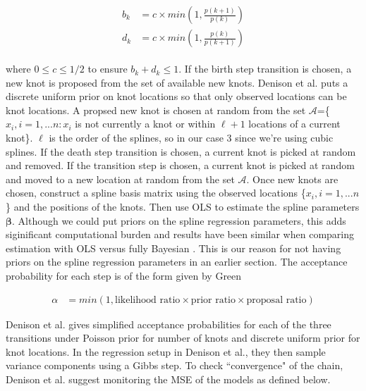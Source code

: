 \documentclass[11pt]{article}\usepackage[]{graphicx}\usepackage[]{color}
\begin{document}
\begin{align}
\begin{split}
\label{knotproposal}
b_k &= c \times min\left(1, \frac{p(k+1)}{p(k)} \right) \\
d_k &= c \times min\left(1, \frac{p(k)}{p(k+1)} \right) 
\end{split}
\end{align}

where $0\leq c \leq 1/2$ to ensure $b_k+d_k \leq 1$. If the birth step transition is chosen, a new knot is proposed from the set of available new knots. Denison et al. puts a discrete uniform prior on knot locations so that only observed locations can be knot locations.  A propsed new knot is chosen at random from the set $\mathcal{A}$=\{$x_i,i=1,...n:x_i$ is not currently a knot or within $\ell+1$ locations of a current knot\}. $\ell$ is the order of the splines, so in our case 3 since we're using cubic splines. If the death step transition is chosen, a current knot is picked at random and removed. If the transition step is chosen, a current knot is picked at random and moved to a new location at random from the set $\mathcal{A}$. Once new knots are chosen, construct a spline basis matrix using the observed locations \{$x_i,i=1,...n$\} and the positions of the knots. Then use OLS to estimate the spline parameters $\boldsymbol{\beta}$. Although we could put priors on the spline regression parameters, this adds siginificant computational burden and results have been similar when comparing estimation with OLS versus fully Bayesian \cite{denison}. This is our reason for not having priors on the spline regression parameters in an earlier section. The acceptance probability for each step is of the form given by Green

\begin{align}
\alpha &= min(1, \text{likelihood ratio} \times \text{prior ratio} \times \text{proposal ratio})
\end{align}

Denison et al. gives simplified acceptance probabilities for each of the three transitions under Poisson prior for number of knots and discrete uniform prior for knot locations. In the regression setup in Denison et al., they then sample variance components using a Gibbs step. To check ``convergence" of the chain, Denison et al. suggest monitoring the MSE of the models as defined below. %

\end{document}
